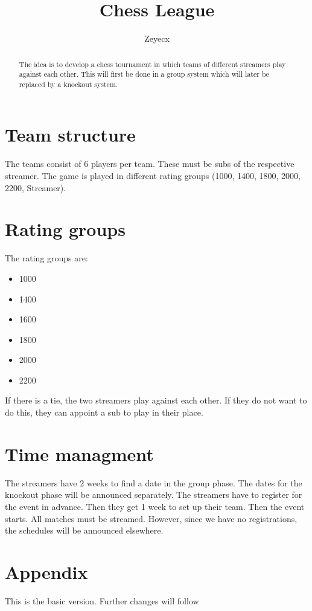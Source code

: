 \documentclass{article}
\title{Chess League}
\author{Zeyecx}
\begin{document}
	\maketitle
	 
\begin{abstract}
	The idea is to develop a chess tournament in which teams of different streamers play against each other.
	This will first be done in a group system which will later be replaced by a knockout system. 
\end{abstract}


\section{Team structure}
The teams consist of 6 players per team. These must be subs of the respective streamer. 
The game is played in different rating groups (1000, 1400, 1800, 2000, 2200, Streamer).

\section{Rating groups}

The rating groups are:
\begin{itemize}
	\item 1000
	\item 1400 
	\item 1600
	\item 1800
	\item 2000
	\item 2200
\end{itemize}
If there is a tie, the two streamers play against each other. If they do not want to do this, they can appoint a sub to play in their place.

\section{Time managment}
The streamers have 2 weeks to find a date in the group phase. The dates for the knockout phase will be announced separately.
The streamers have to register for the event in advance. Then they get 1 week to set up their team.
Then the event starts.
All matches must be streamed.
However, since we have no registrations, the schedules will be announced elsewhere.

\section{Appendix}
This is the basic version. Further changes will follow
	
\end{document}
